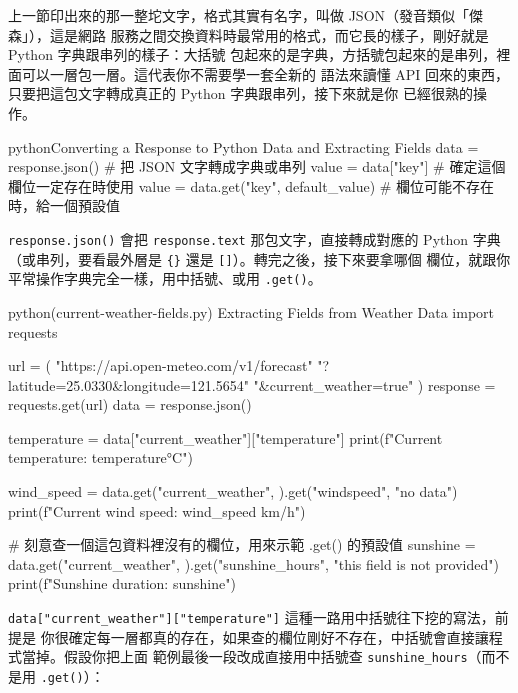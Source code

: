 上一節印出來的那一整坨文字，格式其實有名字，叫做 JSON（發音類似「傑森」），這是網路
服務之間交換資料時最常用的格式，而它長的樣子，剛好就是 Python 字典跟串列的樣子：大括號
包起來的是字典，方括號包起來的是串列，裡面可以一層包一層。這代表你不需要學一套全新的
語法來讀懂 API 回來的東西，只要把這包文字轉成真正的 Python 字典跟串列，接下來就是你
已經很熟的操作。

\begin{code}{python}{Converting a Response to Python Data and Extracting Fields}
data = response.json()             # 把 JSON 文字轉成字典或串列
value = data["key"]                # 確定這個欄位一定存在時使用
value = data.get("key", default_value) # 欄位可能不存在時，給一個預設值
\end{code}

\texttt{response.json()} 會把 \texttt{response.text} 那包文字，直接轉成對應的 Python
字典（或串列，要看最外層是 \texttt{\{\}} 還是 \texttt{[]}）。轉完之後，接下來要拿哪個
欄位，就跟你平常操作字典完全一樣，用中括號、或用 \texttt{.get()}。

\begin{example}{python}{(current-weather-fields.py) Extracting Fields from Weather Data}
import requests

url = (
    "https://api.open-meteo.com/v1/forecast"
    "?latitude=25.0330&longitude=121.5654"
    "&current_weather=true"
)
response = requests.get(url)
data = response.json()

temperature = data["current_weather"]["temperature"]
print(f"Current temperature: {temperature}°C")

wind_speed = data.get("current_weather", {}).get("windspeed", "no data")
print(f"Current wind speed: {wind_speed} km/h")

# 刻意查一個這包資料裡沒有的欄位，用來示範 .get() 的預設值
sunshine = data.get("current_weather", {}).get("sunshine_hours", "this field is not provided")
print(f"Sunshine duration: {sunshine}")
\end{example}


\texttt{data["current\_weather"]["temperature"]} 這種一路用中括號往下挖的寫法，前提是
你很確定每一層都真的存在，如果查的欄位剛好不存在，中括號會直接讓程式當掉。假設你把上面
範例最後一段改成直接用中括號查 \texttt{sunshine\_hours}（而不是用 \texttt{.get()}）：

